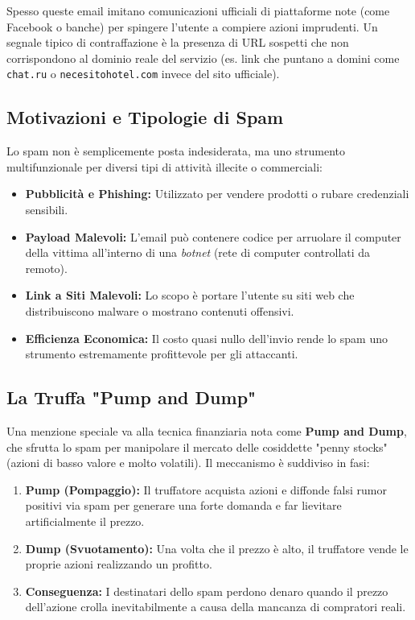 \documentclass{article}
\begin{document}
Spesso queste email imitano comunicazioni ufficiali di piattaforme note (come Facebook o banche) per spingere l'utente a compiere azioni imprudenti. Un segnale tipico di contraffazione è la presenza di URL sospetti che non corrispondono al dominio reale del servizio (es. link che puntano a domini come \texttt{chat.ru} o \texttt{necesitohotel.com} invece del sito ufficiale).

\subsection*{Motivazioni e Tipologie di Spam}

Lo spam non è semplicemente posta indesiderata, ma uno strumento multifunzionale per diversi tipi di attività illecite o commerciali:

\begin{itemize}
    \item \textbf{Pubblicità e Phishing:} Utilizzato per vendere prodotti o rubare credenziali sensibili.
    \item \textbf{Payload Malevoli:} L'email può contenere codice per arruolare il computer della vittima all'interno di una \textit{botnet} (rete di computer controllati da remoto).
    \item \textbf{Link a Siti Malevoli:} Lo scopo è portare l'utente su siti web che distribuiscono malware o mostrano contenuti offensivi.
    \item \textbf{Efficienza Economica:} Il costo quasi nullo dell'invio rende lo spam uno strumento estremamente profittevole per gli attaccanti.
\end{itemize}

\subsection*{La Truffa "Pump and Dump"}

Una menzione speciale va alla tecnica finanziaria nota come \textbf{Pump and Dump}, che sfrutta lo spam per manipolare il mercato delle cosiddette "penny stocks" (azioni di basso valore e molto volatili). Il meccanismo è suddiviso in fasi:

\begin{enumerate}
    \item \textbf{Pump (Pompaggio):} Il truffatore acquista azioni e diffonde falsi rumor positivi via spam per generare una forte domanda e far lievitare artificialmente il prezzo.
    \item \textbf{Dump (Svuotamento):} Una volta che il prezzo è alto, il truffatore vende le proprie azioni realizzando un profitto.
    \item \textbf{Conseguenza:} I destinatari dello spam perdono denaro quando il prezzo dell'azione crolla inevitabilmente a causa della mancanza di compratori reali.
\end{enumerate}
\end{document}

